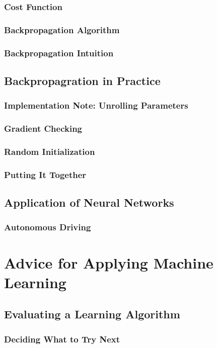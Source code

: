 \documentclass{article}
\begin{document}
\subsubsection{Cost Function}
\subsubsection{Backpropagation Algorithm}
\subsubsection{Backpropagation Intuition}
\subsection{Backpropagration in Practice}
\subsubsection{Implementation Note: Unrolling Parameters}
\subsubsection{Gradient Checking}
\subsubsection{Random Initialization}
\subsubsection{Putting It Together}
\subsection{Application of Neural Networks}
\subsubsection{Autonomous Driving}

\newpage

\section{Advice for Applying Machine Learning}
\subsection{Evaluating a Learning Algorithm}
\subsubsection{Deciding What to Try Next}
\end{document}
